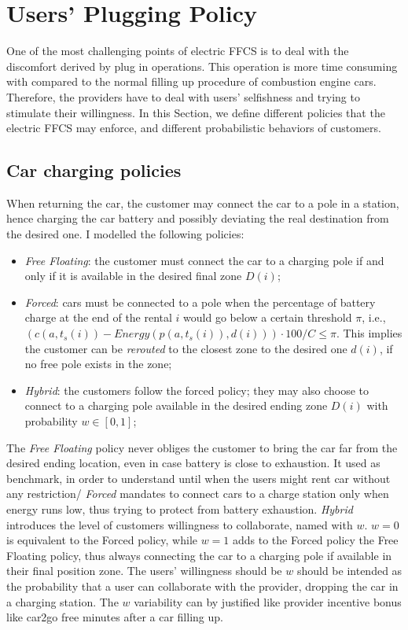 \section{Users' Plugging Policy}
\label{sec:5_4_return_policy}
One of the most challenging points of electric FFCS is to deal with the discomfort derived by plug in operations. This operation is more time consuming with compared to the normal filling up procedure of combustion engine cars. Therefore, the providers have to deal with users' selfishness and trying to stimulate their willingness.  
In this Section, we define different policies that the electric FFCS may enforce, and different probabilistic behaviors of customers. 

\subsection{Car charging policies}
When returning the car, the customer may connect the car to a pole in a station, hence charging the car battery and possibly deviating the real destination from the desired one. I modelled the following policies:
\begin{itemize}
	\item{\it Free Floating}: the customer must connect the car to a charging pole if and only if it is available in the desired final zone $D(i)$;
	\item{\it Forced}: cars must be connected to a pole when the percentage of battery charge at the end of the rental $i$ would go below a certain threshold $\pi$, i.e., $(c(a,t_{s}(i)) - Energy(p(a,t_{s}(i)), d(i))) \cdot 100/ C\leq  \pi $. This implies the customer can be \textit{rerouted} to the closest zone to the desired one $d(i)$, if no free pole exists in the zone; %
	\item{\it Hybrid}: the customers follow the forced policy; they may  also choose to connect to a charging pole available in the desired ending zone $D(i)$ with probability $w\in [0,1]$;
\end{itemize}

The \textit{Free Floating} policy never obliges the customer to bring the car far from the desired ending location, even in case battery is close to exhaustion. It used as benchmark, in order to understand until when the users might rent car without any restriction/
\textit{Forced} mandates to connect cars to a charge station only when energy runs low, thus trying to protect from battery exhaustion.
\textit{Hybrid} introduces the level of customers willingness to collaborate, named with $w$. $w=0$ is equivalent to the Forced policy, while $w=1$ adds to the Forced policy the Free Floating policy,  thus always connecting the car to a charging pole if available in their final position zone. The users' willingness should be $w$ should be intended as the probability that a user can collaborate with the provider, dropping the car in a charging station. The $w$ variability can by justified like provider incentive bonus like car2go free minutes after a car filling up.

